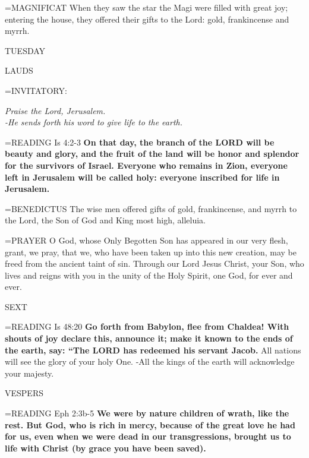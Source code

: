 \hangindent=\parindent \small{MAGNIFICAT 	When they saw the star the Magi were filled with great joy; entering the house, they offered their gifts to the Lord: gold, frankincense and myrrh.\\}

\begin{center}
\normalsize TUESDAY
\end{center}

\begin{flushleft}\normalsize LAUDS\\\end{flushleft}
\hangindent=\parindent \small{INVITATORY:}
\begin{center}
\textit{Praise the Lord, Jerusalem.\\}
\textit{-He sends forth his word to give life to the earth.\\}
\end{center}

\hangindent=\parindent \small{READING}   Is 4:2-3 \textbf{  On that day, the branch of the LORD will be beauty and glory, and the fruit of the land will be honor and splendor for the survivors of Israel. Everyone who remains in Zion, everyone left in Jerusalem will be called holy: everyone inscribed for life in Jerusalem.\\}

\hangindent=\parindent \small{BENEDICTUS 	The wise men offered gifts of gold, frankincense, and myrrh to the Lord, the Son of God and King most high, alleluia.\\}

\hangindent=\parindent \small{PRAYER 	O God, whose Only Begotten Son has appeared in our very flesh, grant, we pray, that we, who have been taken up into this new creation, may be freed from the ancient taint of sin. Through our Lord Jesus Christ, your Son, who lives and reigns with you in the unity of the Holy Spirit, one God, for ever and ever.}

\begin{flushleft}\normalsize SEXT\\\end{flushleft}
\hangindent=\parindent \small{READING}   Is 48:20 \textbf{  Go forth from Babylon, flee from Chaldea! With shouts of joy declare this, announce it; make it known to the ends of the earth, say: “The LORD has redeemed his servant Jacob.}
All nations will see the glory of your holy One.
-All the kings of the earth will acknowledge your majesty.

\begin{flushleft}\normalsize VESPERS\\\end{flushleft}
\hangindent=\parindent \small{READING}   Eph 2:3b-5 \textbf{  We were by nature children of wrath, like the rest. But God, who is rich in mercy, because of the great love he had for us, even when we were dead in our transgressions, brought us to life with Christ (by grace you have been saved).\\}

